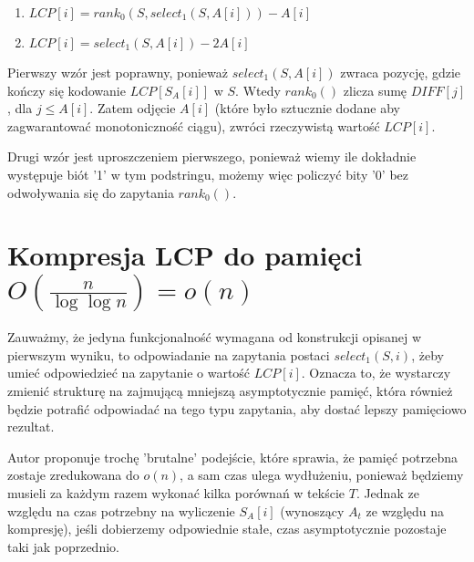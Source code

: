 \documentclass{article}
\begin{document}

\begin{enumerate}
    \item $LCP[i] = rank_0(S, select_1(S, A[i])) - A[i]$
    \item $LCP[i] = select_1(S, A[i]) - 2A[i]$
\end{enumerate}


Pierwszy wzór jest poprawny, ponieważ $select_1(S, A[i])$ zwraca pozycję, gdzie kończy się kodowanie $LCP[S_A[i]]$ w $S$. Wtedy $rank_0()$ zlicza sumę $DIFF[j]$, dla $j \le A[i]$. Zatem odjęcie $A[i]$ (które było sztucznie dodane aby zagwarantować monotoniczność ciągu), zwróci rzeczywistą wartość $LCP[i]$.

Drugi wzór jest uproszczeniem pierwszego, ponieważ wiemy ile dokładnie występuje biót '1' w tym podstringu, możemy więc policzyć bity '0' bez odwoływania się do zapytania $rank_0()$.

\section{Kompresja LCP do pamięci $O(\frac{n}{\log{\log{n}}}) = o(n)$}

Zauważmy, że jedyna funkcjonalność wymagana od konstrukcji opisanej w pierwszym wyniku, to odpowiadanie na zapytania postaci $select_1(S, i)$, żeby umieć odpowiedzieć na zapytanie o wartość $LCP[i]$. Oznacza to, że wystarczy zmienić strukturę na zajmującą mniejszą asymptotycznie pamięć, która również będzie potrafić odpowiadać na tego typu zapytania, aby dostać lepszy pamięciowo rezultat.

Autor proponuje trochę 'brutalne' podejście, które sprawia, że pamięć potrzebna zostaje zredukowana do $o(n)$, a sam czas ulega wydłużeniu, ponieważ będziemy musieli za każdym razem wykonać kilka porównań w tekście $T$. Jednak ze względu na czas potrzebny na wyliczenie $S_A[i]$ (wynoszący $A_t$ ze względu na kompresję), jeśli dobierzemy odpowiednie stałe, czas asymptotycznie pozostaje taki jak poprzednio.
\end{document}
